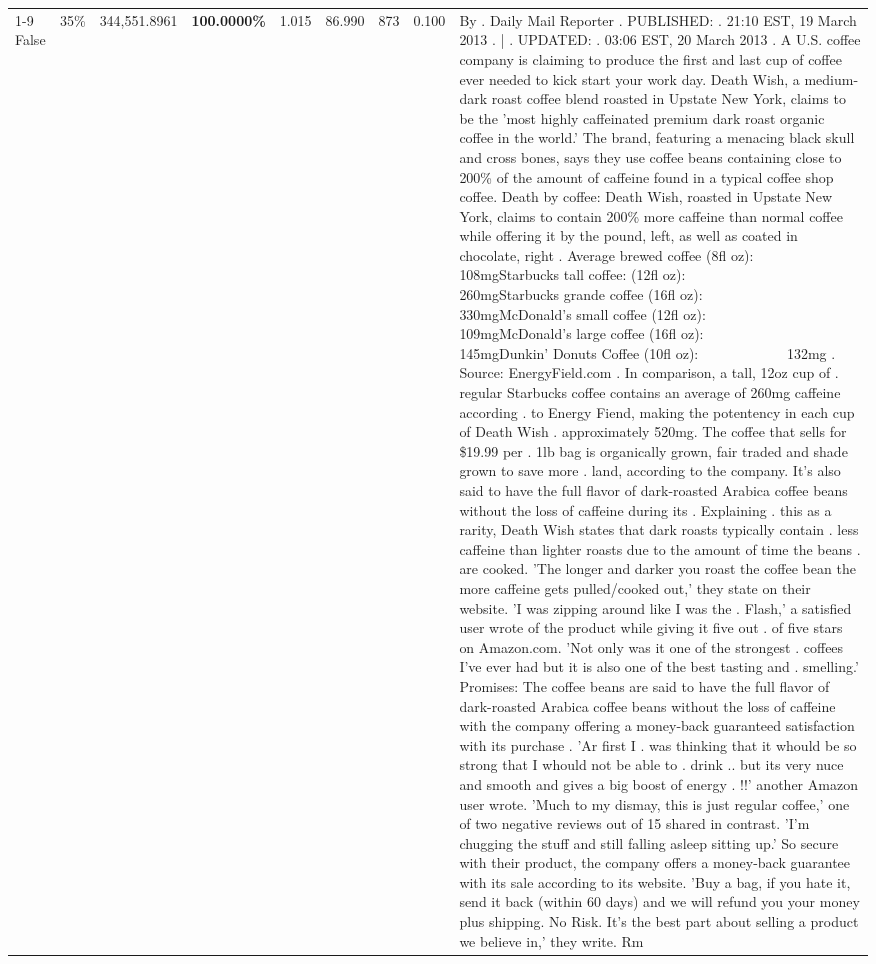 \begin{table}[H]
{\begin{tabular}{lllrlllll}
\cline{1-9} \cline{2-9}
False & 35\% & 344,551.8961 & \bfseries \color{red} 100.0000\% & 1.015 & 86.990 & 873 & 0.100 & By . Daily Mail Reporter . PUBLISHED: . 21:10 EST, 19 March 2013 . | . UPDATED: . 03:06 EST, 20 March 2013 . A U.S. coffee company is claiming to produce the first and last cup of coffee ever needed to kick start your work day. Death Wish, a medium-dark roast coffee blend roasted in Upstate New York, claims to be the 'most highly caffeinated premium dark roast organic coffee in the world.' The brand, featuring a menacing black skull and cross bones, says they use coffee beans containing close to 200\% of the amount of caffeine found in a typical coffee shop coffee. Death by coffee: Death Wish, roasted in Upstate New York, claims to contain 200\% more caffeine than normal coffee while offering it by the pound, left, as well as coated in chocolate, right . Average brewed coffee (8fl oz):              108mgStarbucks tall coffee: (12fl oz):                260mgStarbucks grande coffee (16fl oz):         330mgMcDonald's small coffee (12fl oz):           109mgMcDonald's large coffee (16fl oz):           145mgDunkin' Donuts Coffee (10fl oz):             132mg . Source: EnergyField.com . In comparison, a tall, 12oz cup of . regular Starbucks coffee contains an average of 260mg caffeine according . to Energy Fiend, making the potentency in each cup of Death Wish . approximately 520mg. The coffee that sells for \$19.99 per . 1lb bag is organically grown, fair traded and shade grown to save more . land, according to the company. It's also said to have the full flavor of dark-roasted Arabica coffee beans without the loss of caffeine during its . Explaining . this as a rarity, Death Wish states that dark roasts typically contain . less caffeine than lighter roasts due to the amount of time the beans . are cooked. 'The longer and darker you roast the coffee bean the more caffeine gets pulled/cooked out,' they state on their website. 'I was zipping around like I was the . Flash,' a satisfied user wrote of the product while giving it five out . of five stars on Amazon.com. 'Not only was it one of the strongest . coffees I've ever had but it is also one of the best tasting and . smelling.’ Promises: The coffee beans are said to have the full flavor of dark-roasted Arabica coffee beans without the loss of caffeine with the company offering a money-back guaranteed satisfaction with its purchase . 'Ar first I . was thinking that it whould be so strong that I whould not be able to . drink .. but its very nuce and smooth and gives a big boost of energy . !!' another Amazon user wrote. 'Much to my dismay, this is just regular coffee,' one of two negative reviews out of 15 shared in contrast. 'I'm chugging the stuff and still falling asleep sitting up.' So secure with their product, the company offers a money-back guarantee with its sale according to its website. 'Buy a bag, if you hate it, send it back (within 60 days) and we will refund you your money plus shipping. No Risk. It’s the best part about selling a product we believe in,' they write. Rm \\

\end{tabular}}
\end{table}
